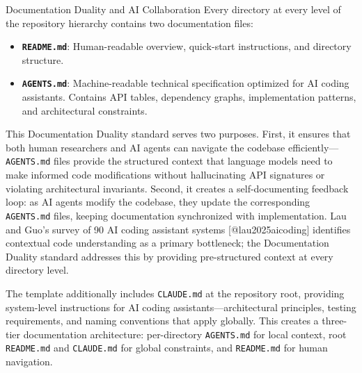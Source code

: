 \documentclass[
  ignorenonframetext,
]{beamer}
\author{\texorpdfstring{}{}}
\date{}
\providecommand{\tightlist}{%
  \setlength{\itemsep}{0pt}\setlength{\parskip}{0pt}}
\begin{document}
\begin{frame}[fragile]{Documentation Duality and AI Collaboration}
\protect{}\label{documentation-duality-and-ai-collaboration}
Every directory at every level of the repository hierarchy contains two
documentation files:

\begin{itemize}
\tightlist
\item
  \textbf{\texttt{README.md}}: Human-readable overview, quick-start
  instructions, and directory structure.
\item
  \textbf{\texttt{AGENTS.md}}: Machine-readable technical specification
  optimized for AI coding assistants. Contains API tables, dependency
  graphs, implementation patterns, and architectural constraints.
\end{itemize}

This Documentation Duality standard serves two purposes. First, it
ensures that both human researchers and AI agents can navigate the
codebase efficiently---\texttt{AGENTS.md} files provide the structured
context that language models need to make informed code modifications
without hallucinating API signatures or violating architectural
invariants. Second, it creates a self-documenting feedback loop: as AI
agents modify the codebase, they update the corresponding
\texttt{AGENTS.md} files, keeping documentation synchronized with
implementation. Lau and Guo's survey of 90 AI coding assistant systems
{[}@lau2025aicoding{]} identifies contextual code understanding as a
primary bottleneck; the Documentation Duality standard addresses this by
providing pre-structured context at every directory level.

The template additionally includes \texttt{CLAUDE.md} at the repository
root, providing system-level instructions for AI coding
assistants---architectural principles, testing requirements, and naming
conventions that apply globally. This creates a three-tier documentation
architecture: per-directory \texttt{AGENTS.md} for local context, root
\texttt{README.md} and \texttt{CLAUDE.md} for global constraints, and
\texttt{README.md} for human navigation.
\end{frame}
\end{document}
